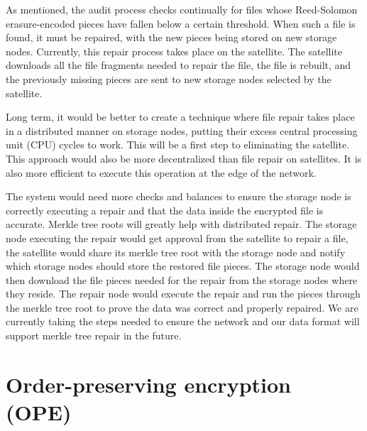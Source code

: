 \documentclass[11pt,fleqn,openany]{book}
\begin{document}
As mentioned, the audit process checks continually for files whose Reed-Solomon
erasure-encoded pieces have fallen below a certain threshold. When such a file
is found, it must be repaired, with
the new pieces being stored on new storage nodes.
Currently, this
repair process takes place on the satellite. The satellite downloads all
the file fragments needed to repair the file, the file is rebuilt, and the
previously missing pieces are sent to new storage nodes
selected by the satellite.

Long term, it would be better to create a technique where file repair takes
place in a distributed manner on storage nodes, putting their excess central processing 
unit (CPU) cycles to work. This will be a first step to eliminating the satellite. This
approach would also be more decentralized than file repair on satellites. It
is also more efficient to execute this operation at the edge of the network.

The system would need more checks and balances to ensure the storage node is
correctly
executing a repair and that the data inside the encrypted file is accurate.
Merkle tree roots will greatly help with distributed repair. The storage
node
executing the repair would get approval from the satellite to repair a file,
the satellite would share its merkle tree root with the storage node and
notify
which storage nodes should store the restored file pieces. The storage node
would then
download the file pieces needed for the repair from the storage nodes where they
reside. The repair node would execute the repair and run the pieces
through the merkle tree root to prove the data was correct and properly
repaired. We are currently taking the steps needed to ensure the network and our
data format will support merkle tree repair in the future.

\section{Order-preserving encryption (OPE)}\label{section:OPE}
\end{document}
